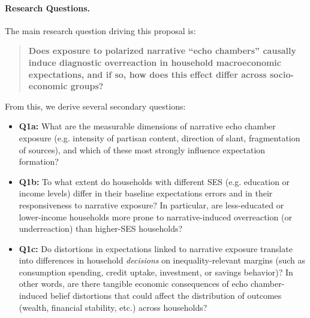 \documentclass[12pt]{article}
\begin{document}
\paragraph{Research Questions.} The main research question driving this proposal is:
\begin{quote}
    \textbf{Does exposure to polarized narrative “echo chambers” causally induce diagnostic overreaction in household macroeconomic expectations, and if so, how does this effect differ across socio-economic groups?}
\end{quote}
From this, we derive several secondary questions:
\begin{itemize}
    \item \textbf{Q1a:} What are the measurable dimensions of narrative echo chamber exposure (e.g. intensity of partisan content, direction of slant, fragmentation of sources), and which of these most strongly influence expectation formation?
    \item \textbf{Q1b:} To what extent do households with different SES (e.g. education or income levels) differ in their baseline expectations errors and in their responsiveness to narrative exposure? In particular, are less-educated or lower-income households more prone to narrative-induced overreaction (or underreaction) than higher-SES households?
    \item \textbf{Q1c:} Do distortions in expectations linked to narrative exposure translate into differences in household \emph{decisions} on inequality-relevant margins (such as consumption spending, credit uptake, investment, or savings behavior)? In other words, are there tangible economic consequences of echo chamber-induced belief distortions that could affect the distribution of outcomes (wealth, financial stability, etc.) across households?
\end{itemize}
\end{document}
